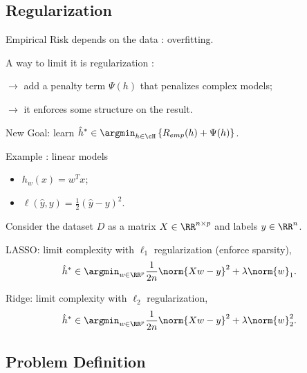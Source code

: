 \documentclass[notheorems]{beamer}
\begin{document}
\subsection{Regularization}
\label{sub:regularization}


\begin{frame}
  Empirical Risk depends on the data : overfitting.

  \vspace{1em}

  A way to limit it is regularization :

  \quad $\rightarrow$ add a penalty term $\Psi(h)$ that penalizes complex models;

  \quad $\rightarrow$ it enforces some structure on the result.

  \vspace{2em}

  New Goal: learn $\displaystyle \hat h^* \in \argmin_{h \in \cH} \left\{ R_{emp}(h) + \Psi(h) \right\}$.
\end{frame}



\begin{frame}
  Example : linear models
  \begin{itemize}
  \item $h_w(x) = w^T x$;
  \item $\ell(\hat y, y) = \frac 12 (\hat y - y)^2$.
  \end{itemize}
  Consider the dataset $D$ as a matrix $X \in \RR^{n\times p}$ and labels $y \in \RR^n$.

  \vspace{1em}

  LASSO: limit complexity with $\ell_1$ regularization (enforce sparsity),
  $$\displaystyle \hat h^* \in \argmin_{w \in \RR^p} \frac{1}{2n} \norm{Xw - y}^2 + \lambda \norm{w}_1.$$

  Ridge: limit complexity with $\ell_2$ regularization,
  $$\displaystyle \hat h^* \in \argmin_{w \in \RR^p} \frac{1}{2n} \norm{Xw - y}^2 + \lambda \norm{w}_2^2.$$
\end{frame}


\subsection{Problem Definition}
\label{sub:problem_definition}
\end{document}
